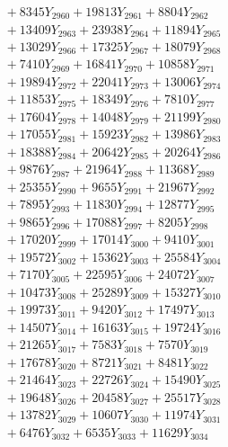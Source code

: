 \documentclass[a4paper,10pt]{article}
\begin{document}
{\begin{align}
&\;  + 8345 Y_{2960} + 19813 Y_{2961} + 8804 Y_{2962} \\[0.3ex]
&\;  + 13409 Y_{2963} + 23938 Y_{2964} + 11894 Y_{2965} \\[0.3ex]
&\;  + 13029 Y_{2966} + 17325 Y_{2967} + 18079 Y_{2968} \\[0.5ex]\allowbreak
&\;  + 7410 Y_{2969} + 16841 Y_{2970} + 10858 Y_{2971} \\[0.3ex]
&\;  + 19894 Y_{2972} + 22041 Y_{2973} + 13006 Y_{2974} \\[0.3ex]
&\;  + 11853 Y_{2975} + 18349 Y_{2976} + 7810 Y_{2977} \\[0.3ex]
&\;  + 17604 Y_{2978} + 14048 Y_{2979} + 21199 Y_{2980} \\[0.3ex]
&\;  + 17055 Y_{2981} + 15923 Y_{2982} + 13986 Y_{2983} \\[0.3ex]
&\;  + 18388 Y_{2984} + 20642 Y_{2985} + 20264 Y_{2986} \\[0.3ex]
&\;  + 9876 Y_{2987} + 21964 Y_{2988} + 11368 Y_{2989} \\[0.3ex]
&\;  + 25355 Y_{2990} + 9655 Y_{2991} + 21967 Y_{2992} \\[0.3ex]
&\;  + 7895 Y_{2993} + 11830 Y_{2994} + 12877 Y_{2995} \\[0.3ex]
&\;  + 9865 Y_{2996} + 17088 Y_{2997} + 8205 Y_{2998} \\[0.5ex]\allowbreak
&\;  + 17020 Y_{2999} + 17014 Y_{3000} + 9410 Y_{3001} \\[0.3ex]
&\;  + 19572 Y_{3002} + 15362 Y_{3003} + 25584 Y_{3004} \\[0.3ex]
&\;  + 7170 Y_{3005} + 22595 Y_{3006} + 24072 Y_{3007} \\[0.3ex]
&\;  + 10473 Y_{3008} + 25289 Y_{3009} + 15327 Y_{3010} \\[0.3ex]
&\;  + 19973 Y_{3011} + 9420 Y_{3012} + 17497 Y_{3013} \\[0.3ex]
&\;  + 14507 Y_{3014} + 16163 Y_{3015} + 19724 Y_{3016} \\[0.3ex]
&\;  + 21265 Y_{3017} + 7583 Y_{3018} + 7570 Y_{3019} \\[0.3ex]
&\;  + 17678 Y_{3020} + 8721 Y_{3021} + 8481 Y_{3022} \\[0.3ex]
&\;  + 21464 Y_{3023} + 22726 Y_{3024} + 15490 Y_{3025} \\[0.3ex]
&\;  + 19648 Y_{3026} + 20458 Y_{3027} + 25517 Y_{3028} \\[0.5ex]\allowbreak
&\;  + 13782 Y_{3029} + 10607 Y_{3030} + 11974 Y_{3031} \\[0.3ex]
&\;  + 6476 Y_{3032} + 6535 Y_{3033} + 11629 Y_{3034} \\[0.3ex]

\end{align}}
\end{document}
